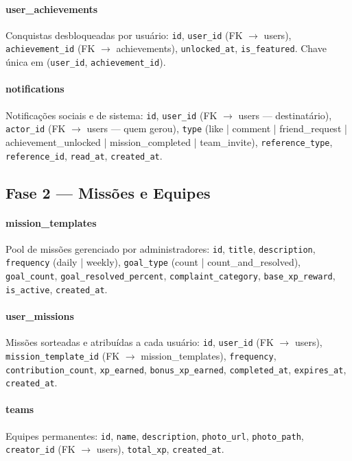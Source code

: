 \paragraph{user\_achievements}
Conquistas desbloqueadas por usuário: \texttt{id}, \texttt{user\_id}
(FK $\to$ users), \texttt{achievement\_id} (FK $\to$ achievements),
\texttt{unlocked\_at}, \texttt{is\_featured}. Chave única em
(\texttt{user\_id}, \texttt{achievement\_id}).

\paragraph{notifications}
Notificações sociais e de sistema: \texttt{id}, \texttt{user\_id}
(FK $\to$ users — destinatário), \texttt{actor\_id}
(FK $\to$ users — quem gerou), \texttt{type} (like | comment |
friend\_request | achievement\_unlocked | mission\_completed | team\_invite),
\texttt{reference\_type}, \texttt{reference\_id}, \texttt{read\_at},
\texttt{created\_at}.

\subsection*{Fase 2 — Missões e Equipes}

\paragraph{mission\_templates}
Pool de missões gerenciado por administradores: \texttt{id}, \texttt{title},
\texttt{description}, \texttt{frequency} (daily | weekly),
\texttt{goal\_type} (count | count\_and\_resolved), \texttt{goal\_count},
\texttt{goal\_resolved\_percent}, \texttt{complaint\_category},
\texttt{base\_xp\_reward}, \texttt{is\_active}, \texttt{created\_at}.

\paragraph{user\_missions}
Missões sorteadas e atribuídas a cada usuário: \texttt{id},
\texttt{user\_id} (FK $\to$ users), \texttt{mission\_template\_id}
(FK $\to$ mission\_templates), \texttt{frequency},
\texttt{contribution\_count}, \texttt{xp\_earned},
\texttt{bonus\_xp\_earned}, \texttt{completed\_at},
\texttt{expires\_at}, \texttt{created\_at}.

\paragraph{teams}
Equipes permanentes: \texttt{id}, \texttt{name}, \texttt{description},
\texttt{photo\_url}, \texttt{photo\_path},
\texttt{creator\_id} (FK $\to$ users), \texttt{total\_xp},
\texttt{created\_at}.

